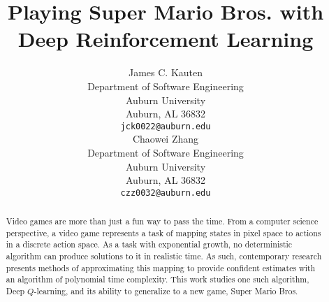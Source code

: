 \title{Playing Super Mario Bros. with Deep Reinforcement Learning}

\author{
	James C. Kauten \\
	Department of Software Engineering \\
	Auburn University \\
	Auburn, AL 36832 \\
	\texttt{jck0022@auburn.edu} \\
	\And
	Chaowei Zhang \\
	Department of Software Engineering \\
	Auburn University \\
	Auburn, AL 36832 \\
	\texttt{czz0032@auburn.edu} \\
}

\maketitle

\begin{abstract}

Video games are more than just a fun way to pass the time. From a computer
science perspective, a video game represents a task of mapping states in
pixel space to actions in a discrete action space. As a task with exponential
growth, no deterministic algorithm can produce solutions to it in realistic
time. As such, contemporary research presents methods of approximating this
mapping to provide confident estimates with an algorithm of polynomial time
complexity. This work studies one such algorithm, Deep $Q$-learning, and its
ability to generalize to a new game, Super Mario Bros.

\end{abstract}
